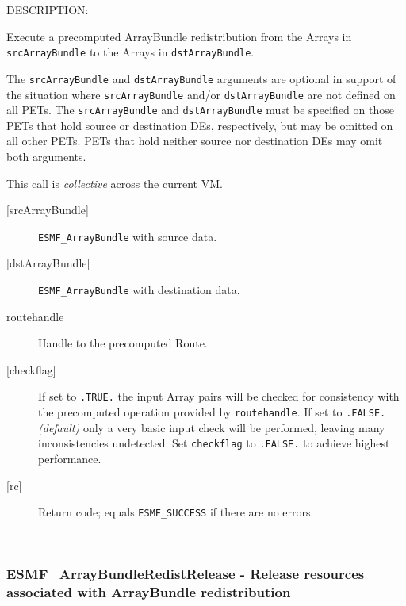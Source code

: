{\sf DESCRIPTION:\\ }


     \begin{sloppypar}
     Execute a precomputed ArrayBundle redistribution from the Arrays in
     {\tt srcArrayBundle} to the Arrays in {\tt dstArrayBundle}.
     \end{sloppypar}
  
     The {\tt srcArrayBundle} and {\tt dstArrayBundle} arguments are optional in
     support of the situation where {\tt srcArrayBundle} and/or
     {\tt dstArrayBundle} are not defined on all PETs. The {\tt srcArrayBundle}
     and {\tt dstArrayBundle} must be specified on those PETs that hold source
     or destination DEs, respectively, but may be omitted on all other PETs.
     PETs that hold neither source nor destination DEs may omit both arguments.
  
     This call is {\em collective} across the current VM.
  
     \begin{description}
     \item [{[srcArrayBundle]}]
       {\tt ESMF\_ArrayBundle} with source data.
     \item [{[dstArrayBundle]}]
       {\tt ESMF\_ArrayBundle} with destination data.
     \item [routehandle]
       Handle to the precomputed Route.
     \item [{[checkflag]}]
       If set to {\tt .TRUE.} the input Array pairs will be checked for
       consistency with the precomputed operation provided by {\tt routehandle}.
       If set to {\tt .FALSE.} {\em (default)} only a very basic input check
       will be performed, leaving many inconsistencies undetected. Set
       {\tt checkflag} to {\tt .FALSE.} to achieve highest performance.
     \item [{[rc]}]
       Return code; equals {\tt ESMF\_SUCCESS} if there are no errors.
     \end{description}
   
 
\mbox{}\hrulefill\ 
 
\subsubsection [ESMF\_ArrayBundleRedistRelease] {ESMF\_ArrayBundleRedistRelease - Release resources associated with ArrayBundle redistribution}


